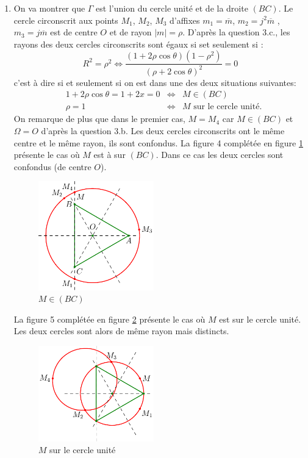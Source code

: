 \begin{enumerate}
\item On va montrer que $\Gamma$ est l'union du cercle unité et de la droite $(BC)$.\newline
Le cercle circonscrit aux points $M_1$, $M_2$, $M_3$ d'affixes $m_1 = \overline{m}$, $m_2 = j^2\overline{m}$ , $m_3 = j\overline{m}$ est de centre $O$ et de rayon $|m|=\rho$. D'après la question 3.c., les rayons des deux cercles circonscrits sont égaux si set seulement si :
\begin{displaymath}
 R^2 = \rho^2 \Leftrightarrow \frac{(1+2\rho\cos\theta)(1-\rho^2)}{(\rho+2\cos \theta)^2} = 0
\end{displaymath}
c'est à dire si et seulement si on est dans une des deux situations suivantes:
\[
\begin{aligned}
  &1+2\rho\cos\theta = 1+2x=0 &\Leftrightarrow& M \in (BC)\\
  &\rho =1 &\Leftrightarrow& M \text{ sur le cercle unité}.
\end{aligned}
\]
On remarque de plus que dans le premier cas, $M = M_4$ car $M \in (BC)$ et $\Omega= O$ d'après la question 3.b. Les deux cercles circonscrits ont le même centre et le même rayon, ils sont confondus.\newline
La figure 4 complétée en figure \ref{fig:Ccomp2_1} présente le cas où $M$ est à sur $(BC)$. Dans ce cas les deux cercles sont confondus (de centre $O$).
\begin{figure}
 \centering
\includegraphics[width=5cm]{Ccomp2_1}
\caption{$M\in (BC)$} \label{fig:Ccomp2_1}
\end{figure} \newline
La figure 5 complétée en figure \ref{fig:Ccomp2_2} présente le cas où $M$ est sur le cercle unité. Les deux cercles sont alors de même rayon mais distincts.
\begin{figure}
 \centering
\includegraphics[width=5cm]{Ccomp2_2}
\caption{$M$ sur le cercle unité} \label{fig:Ccomp2_2}
\end{figure}
\end{enumerate}
